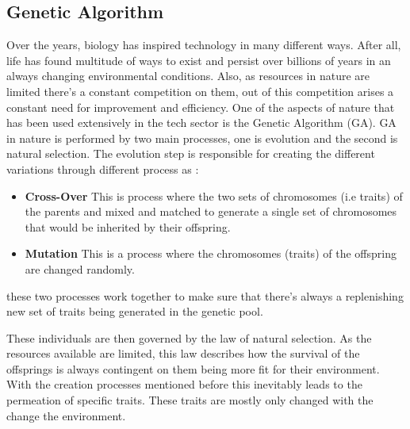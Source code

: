 \documentclass[conference]{IEEEtran}
\begin{document}
\subsection{Genetic Algorithm}
Over the years, biology has inspired technology in many different ways. After all, life has found multitude of ways to exist and persist over billions of years in an always changing environmental conditions. Also, as resources in nature are limited there's a constant competition on them, out of this competition arises a constant need for improvement and efficiency. One of the aspects of nature that has been used extensively in the tech sector is the Genetic Algorithm (GA). GA in nature is performed by two main processes, one is evolution and the second is natural selection. The evolution step is responsible for creating the different variations through different process as :
\begin{itemize}
    \item \textbf{Cross-Over} This is process where the two sets of chromosomes (i.e traits) of the parents and mixed and matched to generate a single set of chromosomes that would be inherited by their offspring.
    \item \textbf{Mutation} This is a process where the chromosomes (traits) of the offspring are changed randomly.
\end{itemize}
these two processes work together to make sure that there's always a replenishing new set of traits being generated in the genetic pool.

These individuals are then governed by the law of natural selection. As the resources available are limited, this law describes how the survival of the offsprings is always contingent on them being more fit for their environment. With the creation processes mentioned before this inevitably leads to the permeation of specific traits. These traits are mostly only changed with the change the environment.
\end{document}
